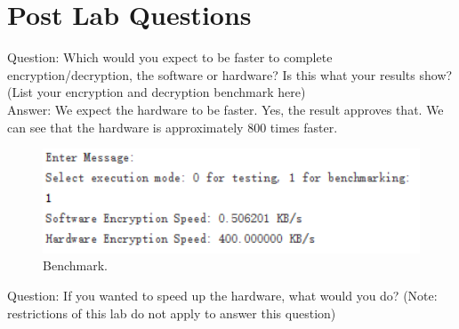 \documentclass[12pt]{article}
\begin{document}
\section{Post Lab Questions}
\begin{table}[H]
    \centering
    \caption{Design statistics table for the multiplier.}
\end{table}

Question: Which would you expect to be faster to complete encryption/decryption, the software or hardware? Is this what your results show? (List your encryption and decryption benchmark here) \\

Answer: We expect the hardware to be faster. Yes, the result approves that. We can see that the hardware is approximately 800 times faster. \\
\begin{figure}[H]
    \centering
    \includegraphics[width=12cm]{benchmark.png}
    \caption{Benchmark.}
\end{figure}

Question: If you wanted to speed up the hardware, what would you do? (Note: restrictions of this lab do not apply to answer this question) \\
\end{document}
